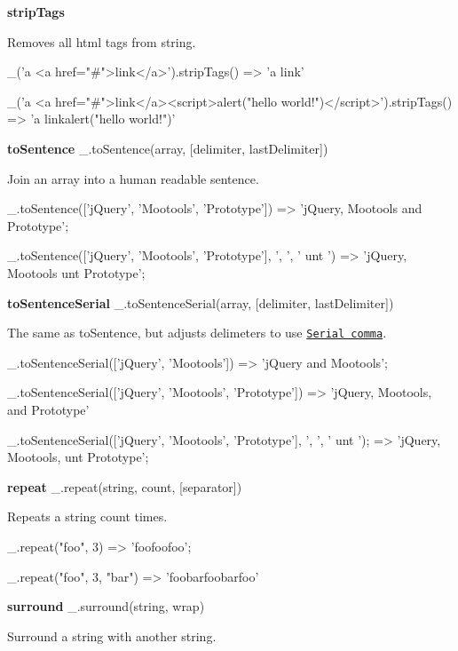{\bfseries strip\+Tags}

Removes all html tags from string.


\begin{DoxyCode}
\_('a <a href="#">link</a>').stripTags()
=> 'a link'

\_('a <a href="#">link</a><script>alert("hello world!")</script>').stripTags()
=> 'a linkalert("hello world!")'
\end{DoxyCode}


{\bfseries to\+Sentence} \+\_\+.\+to\+Sentence(array, \mbox{[}delimiter, last\+Delimiter\mbox{]})

Join an array into a human readable sentence.


\begin{DoxyCode}
\_.toSentence(['jQuery', 'Mootools', 'Prototype'])
=> 'jQuery, Mootools and Prototype';

\_.toSentence(['jQuery', 'Mootools', 'Prototype'], ', ', ' unt ')
=> 'jQuery, Mootools unt Prototype';
\end{DoxyCode}


{\bfseries to\+Sentence\+Serial} \+\_\+.\+to\+Sentence\+Serial(array, \mbox{[}delimiter, last\+Delimiter\mbox{]})

The same as {\ttfamily to\+Sentence}, but adjusts delimeters to use \href{http://en.wikipedia.org/wiki/Serial_comma}{\tt Serial comma}.


\begin{DoxyCode}
\_.toSentenceSerial(['jQuery', 'Mootools'])
=> 'jQuery and Mootools';

\_.toSentenceSerial(['jQuery', 'Mootools', 'Prototype'])
=> 'jQuery, Mootools, and Prototype'

\_.toSentenceSerial(['jQuery', 'Mootools', 'Prototype'], ', ', ' unt ');
=> 'jQuery, Mootools, unt Prototype';
\end{DoxyCode}


{\bfseries repeat} \+\_\+.\+repeat(string, count, \mbox{[}separator\mbox{]})

Repeats a string count times.


\begin{DoxyCode}
\_.repeat("foo", 3)
=> 'foofoofoo';

\_.repeat("foo", 3, "bar")
=> 'foobarfoobarfoo'
\end{DoxyCode}


{\bfseries surround} \+\_\+.\+surround(string, wrap)

Surround a string with another string.


